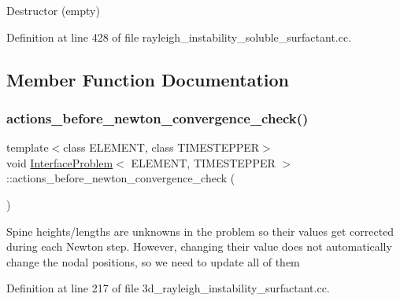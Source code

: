 Destructor (empty) 



Definition at line 428 of file rayleigh\+\_\+instability\+\_\+soluble\+\_\+surfactant.\+cc.



\subsection{Member Function Documentation}
\mbox{\label{classInterfaceProblem_ab4193771472aefce4cd67261491cc344}} 
\subsubsection{\texorpdfstring{actions\+\_\+before\+\_\+newton\+\_\+convergence\+\_\+check()}{actions\_before\_newton\_convergence\_check()}\hspace{0.1cm}{\footnotesize\ttfamily [1/2]}}
{\footnotesize\ttfamily template$<$class E\+L\+E\+M\+E\+NT, class T\+I\+M\+E\+S\+T\+E\+P\+P\+ER$>$ \\
void \hyperlink{classInterfaceProblem}{Interface\+Problem}$<$ E\+L\+E\+M\+E\+NT, T\+I\+M\+E\+S\+T\+E\+P\+P\+ER $>$\+::actions\+\_\+before\+\_\+newton\+\_\+convergence\+\_\+check (\begin{DoxyParamCaption}{ }\end{DoxyParamCaption})\hspace{0.3cm}{\ttfamily [inline]}}

Spine heights/lengths are unknowns in the problem so their values get corrected during each Newton step. However, changing their value does not automatically change the nodal positions, so we need to update all of them 

Definition at line 217 of file 3d\+\_\+rayleigh\+\_\+instability\+\_\+surfactant.\+cc.

\mbox{\label{classInterfaceProblem_ab4193771472aefce4cd67261491cc344}} 
